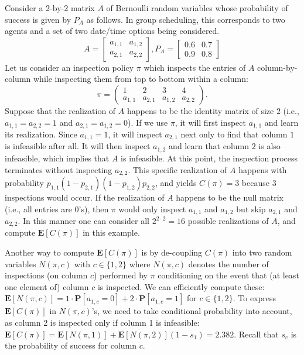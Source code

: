  Consider a 2-by-2 matrix $A$ of Bernoulli random variables whose probability of success is given by $P_A$ as follows. In group scheduling, this corresponds to two agents and a set of two date/time options being considered.
 \begin{equation*}
 A = 
 	\begin{bmatrix}
 		a_{1,1}  & a_{1, 2} \\
 		a_{2,1}  & a_{2, 2}
 	\end{bmatrix},
 P_A = 
 	\begin{bmatrix}
 		0.6  & 0.7  \\
 		0.9  & 0.8 
 	\end{bmatrix}
 \end{equation*}
 Let us consider an inspection policy $\pi$ which inspects the entries of $A$ column-by-column while inspecting them from top to bottom within a column:
 \begin{equation*}
 	\pi = 
 	\begin{pmatrix} 
 	1 & 2 & 3 & 4  \\
 	a_{1,1} & a_{2,1} & a_{1,2} & a_{2,2} 
 	\end{pmatrix}.
 \end{equation*}	
 Suppose that the realization of $A$ happens to be the identity matrix of size $2$ (i.e., $a_{1,1} = a_{2,2} = 1$ and $a_{2,1} = a_{1,2} = 0$). If we use $\pi$, it will first inspect $a_{1,1}$ and learn its realization. Since $a_{1,1} = 1$, it will inspect $a_{2,1}$ next only to find that column $1$ is infeasible after all. It will then inspect $a_{1,2}$ and learn that column $2$ is also infeasible, which implies that $A$ is infeasible. At this point, the inspection process terminates without inspecting $a_{2,2}$.
 This specific realization of $A$ happens with probability $p_{1,1}(1 - p_{2,1})(1-p_{1,2})p_{2,2}$, and yields $C(\pi) = 3$ because 3 inspections would occur. 
 If the realization of $A$ happens to be the null matrix (i.e., all entries are $0$'s), then $\pi$ would only inspect $a_{1,1}$ and $a_{1,2}$ but skip $a_{2,1}$ and $a_{2,2}$.  In this manner one can consider all $2^{2\cdot 2} = 16$ possible realizations of $A$, and compute $\mathbf{E}[C(\pi)]$ in this example. 

 Another way to compute $\mathbf{E}[C(\pi)]$ is by de-coupling $C(\pi)$ into two random variables $N(\pi, c)$ with $c\in\{1,2\}$ where $N(\pi,c)$ denotes the number of inspections (on column $c$) performed by $\pi$ conditioning on the event that (at least one element of) column $c$ is inspected.
 We can efficiently compute these: $\mathbf{E}[N(\pi, c)] = 1 \cdot \mathbf{P}[a_{1,c} = 0] + 2 \cdot \mathbf{P}[a_{1,c} = 1]$ for $c\in \{1, 2\}$.
 To express $\mathbf{E}[C(\pi)]$ in $N(\pi,c)$'s, we need to take conditional probability into account, as column 2 is inspected only if column 1 is infeasible: 
 $\mathbf{E}[C(\pi)] = \mathbf{E}[N(\pi,1)] + \mathbf{E}[N(\pi,2)] (1-s_1) = 2.382$. Recall that $s_c$ is the probability of success for column $c$.


